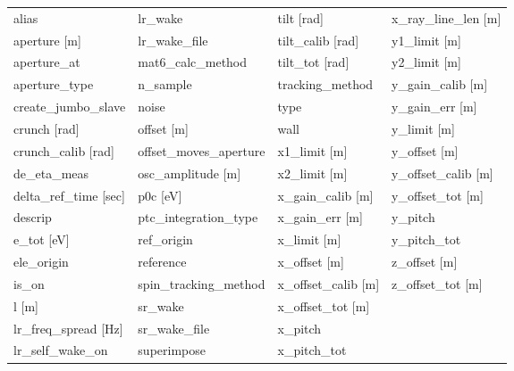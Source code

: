  \begin{tabular}{llll} \toprule
alias                          & lr_wake                        & tilt [rad]                     & x_ray_line_len [m]             \\
aperture [m]                   & lr_wake_file                   & tilt_calib [rad]               & y1_limit [m]                   \\
aperture_at                    & mat6_calc_method               & tilt_tot [rad]                 & y2_limit [m]                   \\
aperture_type                  & n_sample                       & tracking_method                & y_gain_calib [m]               \\
create_jumbo_slave             & noise                          & type                           & y_gain_err [m]                 \\
crunch [rad]                   & offset [m]                     & wall                           & y_limit [m]                    \\
crunch_calib [rad]             & offset_moves_aperture          & x1_limit [m]                   & y_offset [m]                   \\
de_eta_meas                    & osc_amplitude [m]              & x2_limit [m]                   & y_offset_calib [m]             \\
delta_ref_time [sec]           & p0c [eV]                       & x_gain_calib [m]               & y_offset_tot [m]               \\
descrip                        & ptc_integration_type           & x_gain_err [m]                 & y_pitch                        \\
e_tot [eV]                     & ref_origin                     & x_limit [m]                    & y_pitch_tot                    \\
ele_origin                     & reference                      & x_offset [m]                   & z_offset [m]                   \\
is_on                          & spin_tracking_method           & x_offset_calib [m]             & z_offset_tot [m]               \\
l [m]                          & sr_wake                        & x_offset_tot [m]               &                                \\
lr_freq_spread [Hz]            & sr_wake_file                   & x_pitch                        &                                \\
lr_self_wake_on                & superimpose                    & x_pitch_tot                    &                                \\
 \bottomrule
 \end{tabular}
 \vfill
 
